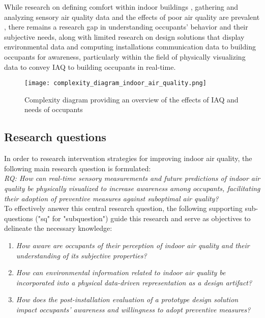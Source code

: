 While research on defining comfort within indoor buildings \cite{alavi_comfort_2017}, gathering and analyzing sensory air quality data \cite{corlan_importance_2021} and the effects of poor air quality are prevalent \cite{klepeis_national_2001}, there remains a research gap in understanding occupants' behavior and their subjective needs, along with limited research on design solutions that display environmental data and computing installations communication data to building occupants for awareness, particularly within the field of physically visualizing data to convey IAQ to building occupants in real-time. 

\begin{figure}[h]
    \centering
    \texttt{[image: complexity\_diagram\_indoor\_air\_quality.png]}
    \caption{Complexity diagram providing an overview of the effects of IAQ and needs of occupants \cite{schweizer_indoor_2007, wang_how_2021, kim_analyzing_2019, alavi_comfort_2017, corlan_importance_2021, klepeis_national_2001}}
    \label{fig:complexity}
\end{figure}


\subsection{Research questions}

In order to research intervention strategies for improving indoor air quality, the following main research question is formulated: \\

\emph{RQ: How can real-time sensory measurements and future predictions of indoor air quality be physically visualized to increase awareness among occupants, facilitating their adoption of preventive measures against suboptimal air quality?}\label{rq:1} \\

To effectively answer this central research question, the following supporting sub-questions ("sq" for "subquestion") guide this research and serve as objectives to delineate the necessary knowledge:

\begin{enumerate}
    \renewcommand{\labelenumi}{SQ\arabic{enumi}:}
    \item \emph{How aware are occupants of their perception of indoor air quality and their understanding of its subjective properties?}\label{subq:1}
    \item \emph{How can environmental information related to indoor air quality be incorporated into a physical data-driven representation as a design artifact?}\label{subq:2}
    \item \emph{How does the post-installation evaluation of a prototype design solution impact occupants' awareness and willingness to adopt preventive measures?}\label{subq:3}\\
\end{enumerate}